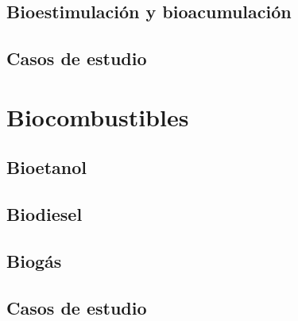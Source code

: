 \documentclass{../Resume}
\begin{document}
    \chapter{Bioestimulación y bioacumulación}
    \chapter{Casos de estudio}

\part{Biocombustibles}

    \chapter{Bioetanol}
    \chapter{Biodiesel}
    \chapter{Biogás}
    \chapter{Casos de estudio}


\newpage


\end{document}
